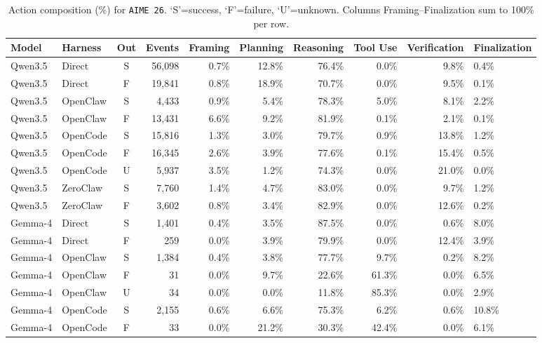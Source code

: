 \begin{table}[t]
\centering
\fontsize{7.5}{8.5}\selectfont
\renewcommand{\arraystretch}{1.12}
\setlength{\tabcolsep}{3.5pt}
\caption{Action composition (\%) for \texttt{AIME~26}. `S'=success, `F'=failure, `U'=unknown. Columns Framing--Finalization sum to 100\% per row.}
\label{tab:action-aime}
\vspace{-2pt}
\begin{tabular}{@{}llcrrrrrr@{}}
\toprule
Model & Harness & Out & Events & Framing & Planning & Reasoning & Tool Use & Verification & Finalization \\
\midrule
  Qwen3.5 & Direct & S & 56,098 & 0.7\% & 12.8\% & 76.4\% & 0.0\% & 9.8\% & 0.4\% \\
  Qwen3.5 & Direct & F & 19,841 & 0.8\% & 18.9\% & 70.7\% & 0.0\% & 9.5\% & 0.1\% \\
  Qwen3.5 & OpenClaw & S & 4,433 & 0.9\% & 5.4\% & 78.3\% & 5.0\% & 8.1\% & 2.2\% \\
  Qwen3.5 & OpenClaw & F & 13,431 & 6.6\% & 9.2\% & 81.9\% & 0.1\% & 2.1\% & 0.1\% \\
  Qwen3.5 & OpenCode & S & 15,816 & 1.3\% & 3.0\% & 79.7\% & 0.9\% & 13.8\% & 1.2\% \\
  Qwen3.5 & OpenCode & F & 16,345 & 2.6\% & 3.9\% & 77.6\% & 0.1\% & 15.4\% & 0.5\% \\
  Qwen3.5 & OpenCode & U & 5,937 & 3.5\% & 1.2\% & 74.3\% & 0.0\% & 21.0\% & 0.0\% \\
  Qwen3.5 & ZeroClaw & S & 7,760 & 1.4\% & 4.7\% & 83.0\% & 0.0\% & 9.7\% & 1.2\% \\
  Qwen3.5 & ZeroClaw & F & 3,602 & 0.8\% & 3.4\% & 82.9\% & 0.0\% & 12.6\% & 0.2\% \\
\midrule
  Gemma-4 & Direct & S & 1,401 & 0.4\% & 3.5\% & 87.5\% & 0.0\% & 0.6\% & 8.0\% \\
  Gemma-4 & Direct & F & 259 & 0.0\% & 3.9\% & 79.9\% & 0.0\% & 12.4\% & 3.9\% \\
  Gemma-4 & OpenClaw & S & 1,384 & 0.4\% & 3.8\% & 77.7\% & 9.7\% & 0.2\% & 8.2\% \\
  Gemma-4 & OpenClaw & F & 31 & 0.0\% & 9.7\% & 22.6\% & 61.3\% & 0.0\% & 6.5\% \\
  Gemma-4 & OpenClaw & U & 34 & 0.0\% & 0.0\% & 11.8\% & 85.3\% & 0.0\% & 2.9\% \\
  Gemma-4 & OpenCode & S & 2,155 & 0.6\% & 6.6\% & 75.3\% & 6.2\% & 0.6\% & 10.8\% \\
  Gemma-4 & OpenCode & F & 33 & 0.0\% & 21.2\% & 30.3\% & 42.4\% & 0.0\% & 6.1\% \\

\end{tabular}
\end{table}
